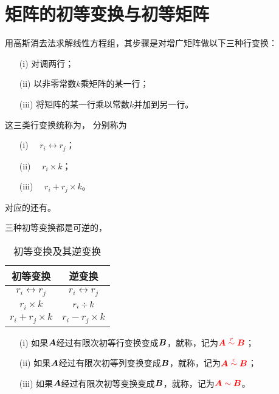 \section{矩阵的初等变换与初等矩阵}

用高斯消去法求解线性方程组，其步骤是对增广矩阵做以下三种行变换：
\begin{itemize}
        \item[(i)] 对调两行；
        \item[(ii)] 以非零常数$k$乘矩阵的某一行；
        \item[(iii)] 将矩阵的某一行乘以常数$k$并加到另一行。
\end{itemize}
这三类行变换统称为， 分别称为
\begin{itemize}
        \item[(i)]   $\quad r_i \leftrightarrow r_j$；
        \item[(ii)]        $\quad r_i \times k$；
        \item[(iii)]  $\quad r_i + r_j \times k $。
\end{itemize}
 对应的还有。  




三种初等变换都是可逆的，
\begin{table}[htbp]
        \centering
        \begin{tabular}{|c|c|} \hline
                初等变换 &  逆变换 \\\hline
                $r_i \leftrightarrow r_j$ & $r_i \leftrightarrow r_j$ \\[0.2cm]\hline
                $r_i \times k$ & $\displaystyle r_i \div k$ \\[0.2cm]\hline
                $r_i + r_j \times k$ & $r_i - r_j\times k$ \\[0.2cm]\hline
        \end{tabular}
        \caption{初等变换及其逆变换}
\end{table}






\begin{dingyi}[矩阵的等价]
  
  \begin{itemize}
  \item[(i)] 如果$\boldsymbol{A}$经过有限次初等行变换变成$\boldsymbol{B}$，就称，记为$\textcolor{red}{\boldsymbol{A}\overset{r}{\sim} \boldsymbol{B}}$；
  \item[(ii)] 如果$\boldsymbol{A}$经过有限次初等列变换变成$\boldsymbol{B}$，就称，记为$\textcolor{red}{\boldsymbol{A}\overset{c}{\sim} \boldsymbol{B}}$；
  \item[(iii)] 如果$\boldsymbol{A}$经过有限次初等变换变成$\boldsymbol{B}$，就称，记为$\textcolor{red}{\boldsymbol{A}\sim \boldsymbol{B}}$。
  \end{itemize}
\end{dingyi}




